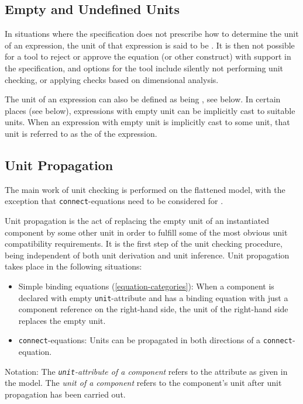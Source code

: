 \subsection{Empty and Undefined Units}\label{empty-and-undefined-units}

In situations where the specification does not prescribe how to determine the unit of an expression, the unit of that expression is said to be .
It is then not possible for a tool to reject or approve the equation (or other construct) with support in the specification, and options for the tool include silently not performing unit checking, or applying checks based on dimensional analysis.

The unit of an expression can also be defined as being , see below.
In certain places (see below), expressions with empty unit can be implicitly cast to suitable units.
When an expression with empty unit is implicitly cast to some unit, that unit is referred to as the  of the expression.


\subsection{Unit Propagation}\label{unit-propagation}

The main work of unit checking is performed on the flattened model, with the exception that \lstinline!connect!-equations need to be considered for .

Unit propagation is the act of replacing the empty unit of an instantiated component by some other unit in order to fulfill some of the most obvious unit compatibility requirements.
It is the first step of the unit checking procedure, being independent of both unit derivation and unit inference.
Unit propagation takes place in the following situations:
\begin{itemize}
\item
  Simple binding equations (\cref{equation-categories}):
  When a component is declared with empty \lstinline!unit!-attribute and has a binding equation with just a component reference on the right-hand side, the unit of the right-hand side replaces the empty unit.
\item
  \lstinline!connect!-equations:
  Units can be propagated in both directions of a \lstinline!connect!-equation.
\end{itemize}

Notation: The \emph{\lstinline!unit!-attribute of a component} refers to the attribute as given in the model.
The \emph{unit of a component} refers to the component's unit after unit propagation has been carried out.

